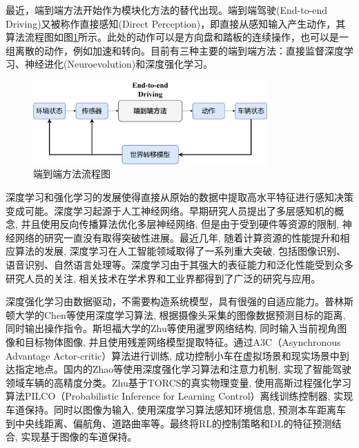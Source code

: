 最近，端到端方法开始作为模块化方法的替代出现。端到端驾驶(End-to-end Driving)又被称作直接感知(Direct Perception)\cite{2015DeepDriving}，即直接从感知输入产生动作，其算法流程图如图\ref{端到端方法流程图}所示。此处的动作可以是方向盘和踏板的连续操作，也可以是一组离散的动作，例如加速和转向。目前有三种主要的端到端方法：直接监督深度学习\cite{1989Alvinn}\cite{2016End}、神经进化\cite{1996Evolution}(Neuroevolution)和深度强化学习\cite{2017DRL_end_to_end}。

\begin{figure}[htbp]
  \vspace{13pt} %
  \centering
  \includegraphics[width=0.8\textwidth]{images/chapter1/EndtoEnd_structure.png}
  \caption{端到端方法流程图}\label{端到端方法流程图} %
\end{figure}

深度学习和强化学习的发展使得直接从原始的数据中提取高水平特征进行感知决策变成可能。深度学习起源于人工神经网络。早期研究人员提出了多层感知机的概念, 并且使用反向传播算法优化多层神经网络, 但是由于受到硬件等资源的限制, 神经网络的研究一直没有取得突破性进展。最近几年, 随着计算资源的性能提升和相应算法的发展, 深度学习在人工智能领域取得了一系列重大突破, 包括图像识别、语音识别、自然语言处理等。深度学习由于其强大的表征能力和泛化性能受到众多研究人员的关注, 相关技术在学术界和工业界都得到了广泛的研究与应用。

深度强化学习由数据驱动，不需要构造系统模型，具有很强的自适应能力。普林斯顿大学的Chen等使用深度学习算法, 根据摄像头采集的图像数据预测目标的距离, 同时输出操作指令\cite{2015DeepDriving}。斯坦福大学的Zhu等使用暹罗网络结构, 同时输入当前视角图像和目标物体图像, 并且使用残差网络模型提取特征。通过A3C（Asynchronous Advantage Actor-critic）算法进行训练, 成功控制小车在虚拟场景和现实场景中到达指定地点\cite{2016Target}。国内的Zhao等使用深度强化学习算法和注意力机制, 实现了智能驾驶领域车辆的高精度分类\cite{2017Deepzhao}。Zhu基于TORCS的真实物理变量, 使用高斯过程强化学习算法PILCO（Probabilistic Inference for Learning Control）离线训练控制器, 实现车道保持。同时以图像为输入, 使用深度学习算法感知环境信息, 预测本车距离车到中央线距离、偏航角、道路曲率等。最终将RL的控制策略和DL的特征预测结合, 实现基于图像的车道保持。

